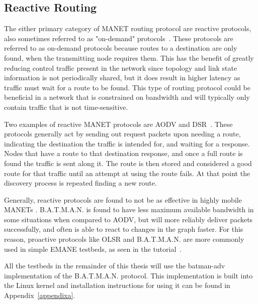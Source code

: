 \subsection{Reactive Routing}
The either primary category of MANET routing protocol are reactive protocols, also sometimes referred to as "on-demand" protocols~\cite{manet_survey}.
These protocols are referred to as on-demand protocols because routes to a destination are only found, when the transmitting node requires them.
This has the benefit of greatly reducing control traffic present in the network since topology and link state information is not periodically shared, but it does result in higher latency as traffic must wait for a route to be found.
This type of routing protocol could be beneficial in a network that is constrained on bandwidth and will typically only contain traffic that is not time-sensitive.\par
Two examples of reactive MANET protocols are AODV and DSR~\cite{reactive_routing}.
These protocols generally act by sending out request packets upon needing a route, indicating the destination the traffic is intended for, and waiting for a response.
Nodes that have a route to that destination response, and once a full route is found the traffic is sent along it.
The route is then stored and considered a good route for that traffic until an attempt at using the route fails.
At that point the discovery process is repeated finding a new route.\par
Generally, reactive protocols are found to not be as effective in highly mobile MANETs \cite{aodv_batman,reactive_routing}.
B.A.T.M.A.N. is found to have less maximum available bandwidth in some situations when compared to AODV, but will more reliably deliver packets successfully, and often is able to react to changes in the graph faster.
For this reason, proactive protocols like OLSR and B.A.T.M.A.N. are more commonly used in simple EMANE testbeds, as seen in the tutorial~\cite{emane_tutorial}.\par
All the testbeds in the remainder of this thesis will use the batman-adv implementation of the B.A.T.M.A.N. protocol.
This implementation is built into the Linux kernel and installation instructions for using it can be found in Appendix~\ref{appendixa}.

